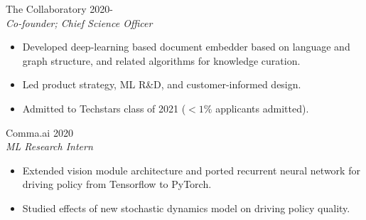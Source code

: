 \documentclass[margin]{res}
\begin{document}
\begin{resume}
                The Collaboratory \hfill 2020- \\
                 {\sl Co-founder; Chief Science Officer}
                 \begin{itemize}  \itemsep -2pt %
                 \item Developed deep-learning based document embedder
                   based on language and graph structure, and related algorithms
                   for knowledge curation.
                 \item Led product strategy, ML R\&D,
                   and customer-informed design.
                 \item Admitted to Techstars class of 2021 ($<1\%$ applicants admitted).
                 \end{itemize}

                 Comma.ai \hfill            2020 \\
		{\sl ML Research Intern}
                 \begin{itemize}  \itemsep -2pt %
                 \item Extended	vision module architecture and ported recurrent
                   neural network for driving policy from Tensorflow to PyTorch.
                 \item Studied effects of new stochastic dynamics model on driving
                   policy quality.
                 \end{itemize}


\end{resume}
\end{document}

